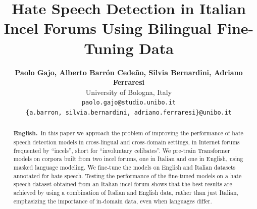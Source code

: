 \documentclass[11pt]{article}
\title{Hate Speech Detection in Italian Incel Forums Using Bilingual Fine-Tuning Data}
\author{\textbf{Paolo Gajo, Alberto Barrón Cedeño, Silvia Bernardini, Adriano Ferraresi} \\
  University of Bologna, Italy \\
  {\tt paolo.gajo@studio.unibo.it}\\
  {\tt \{a.barron, silvia.bernardini, adriano.ferraresi\}@unibo.it}}
\date{}
\begin{document}
\maketitle
\begin{abstract}
\textbf{English.}~In this paper we approach the problem of improving the performance of hate speech detection models in cross-lingual and cross-domain settings, in Internet forums frequented by ``incels'', short for ``involuntary celibates''. We pre-train Transformer models on corpora built from two incel forums, one in Italian and one in English, using masked language modeling. We fine-tune the models on English and Italian datasets annotated for hate speech.
Testing the performance of the fine-tuned models on a hate speech dataset obtained from an Italian incel forum shows that the best results are achieved by using a combination of Italian and English data, rather than just Italian, emphasizing the importance of in-domain data, even when languages differ.


\end{abstract}
\end{document}
